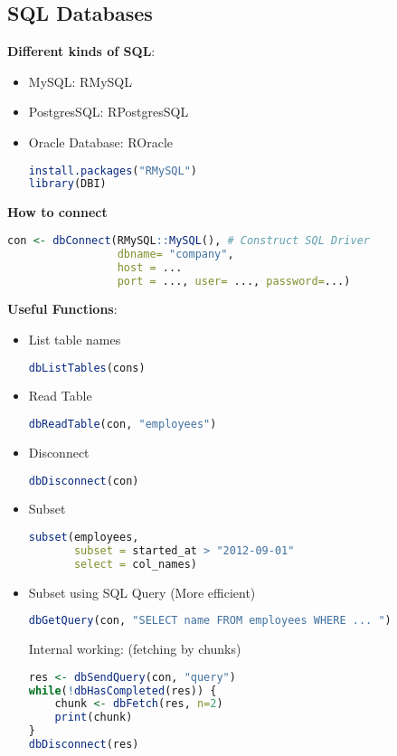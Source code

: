 \documentclass{article}
\begin{document}
\begin{multicols}{2}
\subsection{SQL Databases}
\textbf{Different kinds of SQL}:
\begin{itemize}
	\item MySQL: RMySQL
	\item PostgresSQL: RPostgresSQL
	\item Oracle Database: ROracle
	\begin{lstlisting}[language=R]
install.packages("RMySQL")
library(DBI)\end{lstlisting}
\end{itemize}
\textbf{How to connect}
\begin{lstlisting}[language=R]
con <- dbConnect(RMySQL::MySQL(), # Construct SQL Driver
                 dbname= "company",
                 host = ...
                 port = ..., user= ..., password=...)
\end{lstlisting}
\textbf{Useful Functions}:
\begin{itemize}
	\item List table names
	\begin{lstlisting}[language=R]
dbListTables(cons)\end{lstlisting}
    \item Read Table
    \begin{lstlisting}[language=R]
dbReadTable(con, "employees")\end{lstlisting}
    \item Disconnect
    \begin{lstlisting}[language=R]
dbDisconnect(con)\end{lstlisting}
\item Subset
\begin{lstlisting}[language=R]
subset(employees,
       subset = started_at > "2012-09-01"
       select = col_names)\end{lstlisting}
\item Subset using SQL Query (More efficient)
\begin{lstlisting}[language=R]
dbGetQuery(con, "SELECT name FROM employees WHERE ... ")\end{lstlisting}
Internal working: (fetching by chunks)
\begin{lstlisting}[language=R]
res <- dbSendQuery(con, "query")
while(!dbHasCompleted(res)) {
	chunk <- dbFetch(res, n=2)
	print(chunk)
}
dbDisconnect(res)
\end{lstlisting}
\end{itemize}

\end{multicols}
\end{document}
